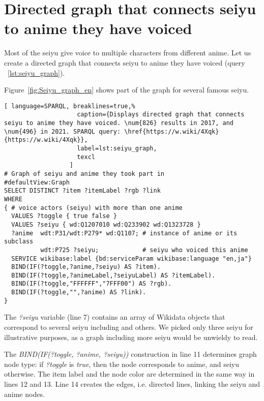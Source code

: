 \section{Directed graph that connects seiyu to anime they have voiced}

Most of the seiyu give voice to multiple characters from different anime. Let us create a directed graph that connects seiyu to anime they have voiced (query ~\ref{lst:seiyu_graph}).

Figure~\ref{fig:Seiyu_graph_en} shows part of the graph for several famous seiyu.

\begin{lstlisting}[ language=SPARQL, breaklines=true,%
                    caption={Displays directed graph that connects seiyu to anime they have voiced. \num{826} results in 2017, and \num{496} in 2021. SPARQL query: \href{https://w.wiki/4Xqk}{https://w.wiki/4Xqk}},
                    label=lst:seiyu_graph,
                    texcl
                  ]
# Graph of seiyu and anime they took part in
#defaultView:Graph
SELECT DISTINCT ?item ?itemLabel ?rgb ?link
WHERE
{ # voice actors (seiyu) with more than one anime
  VALUES ?toggle { true false }
  VALUES ?seiyu { wd:Q1207010 wd:Q233902 wd:Q1323728 }
  ?anime  wdt:P31/wdt:P279* wd:Q1107; # instance of anime or its subclass
          wdt:P725 ?seiyu;            # seiyu who voiced this anime 
  SERVICE wikibase:label {bd:serviceParam wikibase:language "en,ja"}
  BIND(IF(?toggle,?anime,?seiyu) AS ?item).
  BIND(IF(?toggle,?animeLabel,?seiyuLabel) AS ?itemLabel).
  BIND(IF(?toggle,"FFFFFF","7FFF00") AS ?rgb).
  BIND(IF(?toggle,"",?anime) AS ?link).
}
\end{lstlisting}%

The \emph{?seiyu} variable (line 7) contains an array of Wikidata objects that correspond to several seiyu including  and others. We picked only three seiyu for illustrative purposes, as a graph including more seiyu would be unwieldy to read.

The \emph{BIND(IF(?toggle, ?anime, ?seiyu))} construction in line \num{11} determines graph node type: if \emph{?toggle} is \emph{true}, then the node corresponds to anime, and seiyu otherwise. The item label and the node color are determined in the same way in lines \num{12} and \num{13}. Line \num{14} creates the edges, i.e. directed lines, linking the seiyu and anime nodes.

